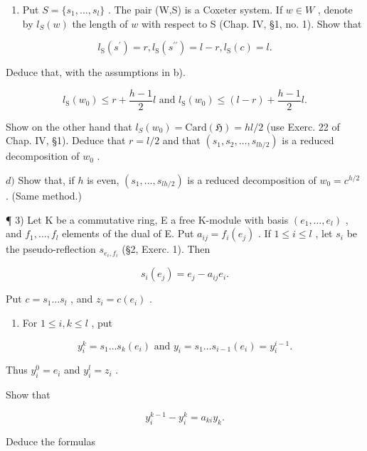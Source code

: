 \begin{enumerate}
\def\labelenumi{\alph{enumi})}
\setcounter{enumi}{2}
\tightlist
\item
  Put \(S = \{s_1, \ldots, s_l\}\) . The pair (W,S) is a Coxeter system. If \(w \in W\) , denote by \(l_S(w)\) the length of \(w\) with respect to S (Chap. IV, §1, no. 1). Show that
\end{enumerate}

\[
l _ {\mathrm{S}} (s ^ {\prime}) = r, l _ {\mathrm{S}} (s ^ {\prime \prime}) = l - r, l _ {\mathrm{S}} (c) = l.
\]

Deduce that, with the assumptions in b).

\[
l _ {\mathrm{S}} (w _ {0}) \leqslant r + \frac {h - 1}{2} l \text { and } l _ {\mathrm{S}} (w _ {0}) \leqslant (l - r) + \frac {h - 1}{2} l.
\]

Show on the other hand that \(l_{S}(w_0) = \mathrm{Card}(\mathfrak{H}) = hl / 2\) (use Exerc. 22 of Chap. IV, §1). Deduce that \(r = l / 2\) and that \((s_1, s_2, \ldots, s_{lh / 2})\) is a reduced decomposition of \(w_0\) .

\(d)\) Show that, if \(h\) is even, \((s_1,\ldots ,s_{lh / 2})\) is a reduced decomposition of \(w_{0} = c^{h / 2}\) . (Same method.)

¶ 3) Let K be a commutative ring, E a free K-module with basis \((e_1, \ldots, e_l)\) , and \(f_1, \ldots, f_l\) elements of the dual of E. Put \(a_{ij} = f_i(e_j)\) . If \(1 \leqslant i \leqslant l\) , let \(s_i\) be the pseudo-reflection \(s_{e_i, f_i}\) (\S 2, Exerc. 1). Then

\[
s _ {i} (e _ {j}) = e _ {j} - a _ {i j} e _ {i}.
\]

Put \(c = s_1 \ldots s_l\) , and \(z_i = c(e_i)\) .

\begin{enumerate}
\def\labelenumi{\alph{enumi})}
\tightlist
\item
  For \(1 \leqslant i, k \leqslant l\) , put
\end{enumerate}

\[
y _ {i} ^ {k} = s _ {1} \dots s _ {k} (e _ {i}) \text { and } y _ {i} = s _ {1} \dots s _ {i - 1} (e _ {i}) = y _ {i} ^ {i - 1}.
\]

Thus \(y_{i}^{0} = e_{i}\) and \(y_{i}^{l} = z_{i}\) .

Show that

\[
y _ {i} ^ {k - 1} - y _ {i} ^ {k} = a _ {k i} y _ {k}.
\]

Deduce the formulas

